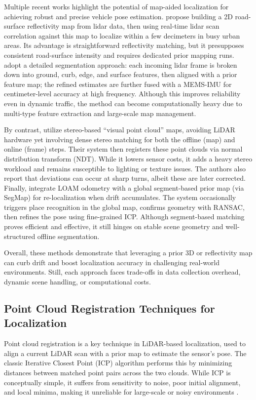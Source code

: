 Multiple recent works highlight the potential of map-aided localization for achieving robust and precise vehicle pose estimation.\cite{Levinson2007MapBased} propose building a 2D road-surface reflectivity map from lidar data, then using real-time lidar scan correlation against this map to localize within a few decimeters in busy urban areas. Its advantage is straightforward reflectivity matching, but it presupposes consistent road-surface intensity and requires dedicated prior mapping runs.\cite{liu2019segmentation} adopt a detailed segmentation approach: each incoming lidar frame is broken down into ground, curb, edge, and surface features, then aligned with a prior feature map; the refined estimates are further fused with a MEMS-IMU for centimeter-level accuracy at high frequency. Although this improves reliability even in dynamic traffic, the method can become computationally heavy due to multi-type feature extraction and large-scale map management.

By contrast,\cite{Lin2021Autonomous} utilize stereo-based “visual point cloud” maps, avoiding LiDAR hardware yet involving dense stereo matching for both the offline (map) and online (frame) steps. Their system then registers these point clouds via normal distribution transform (NDT). While it lowers sensor costs, it adds a heavy stereo workload and remains susceptible to lighting or texture issues. The authors also report that deviations can occur at sharp turns, albeit these are later corrected. Finally, \cite{Rozenberszki2020LOL} integrate LOAM odometry with a global segment-based prior map (via SegMap) for re-localization when drift accumulates. The system occasionally triggers place recognition in the global map, confirms geometry with RANSAC, then refines the pose using fine-grained ICP. Although segment-based matching proves efficient and effective, it still hinges on stable scene geometry and well-structured offline segmentation.

Overall, these methods demonstrate that leveraging a prior 3D or reflectivity map can curb drift and boost localization accuracy in challenging real-world environments. Still, each approach faces trade-offs in data collection overhead, dynamic scene handling, or computational costs.

\subsection{ Point Cloud Registration Techniques for Localization}
Point cloud registration is a key technique in LiDAR-based localization, used to align a current LiDAR scan with a prior map to estimate the sensor’s pose. The classic Iterative Closest Point (ICP) algorithm performs this by minimizing distances between matched point pairs across the two clouds. While ICP is conceptually simple, it suffers from sensitivity to noise, poor initial alignment, and local minima, making it unreliable for large-scale or noisy environments \cite{BeslICP1992}.\\

